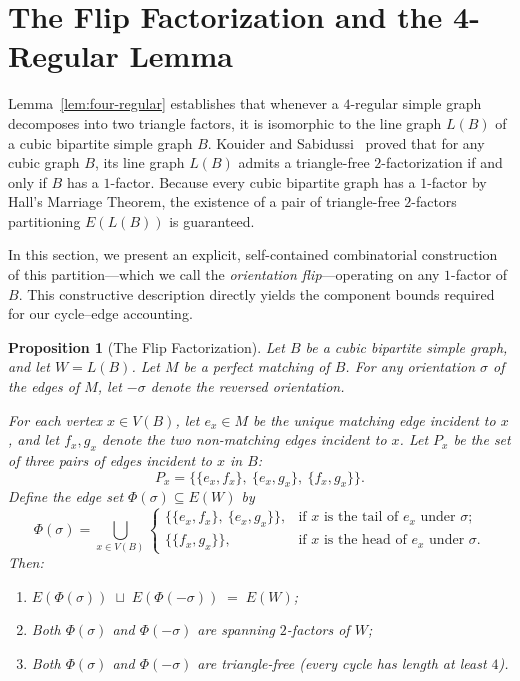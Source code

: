 \documentclass[11pt,reqno]{amsart}
\newtheorem{proposition}[theorem]{Proposition}
\theoremstyle{definition}
\theoremstyle{remark}
\begin{document}
\section{The Flip Factorization and the 4-Regular Lemma}\label{sec:flip}

Lemma~\ref{lem:four-regular} establishes that whenever a $4$-regular simple graph decomposes into two triangle factors, it is isomorphic to the line graph $L(B)$ of a cubic bipartite simple graph $B$. Kouider and Sabidussi~\cite{KS95} proved that for any cubic graph $B$, its line graph $L(B)$ admits a triangle-free $2$-factorization if and only if $B$ has a $1$-factor. Because every cubic bipartite graph has a $1$-factor by Hall's Marriage Theorem, the existence of a pair of triangle-free $2$-factors partitioning $E(L(B))$ is guaranteed.

In this section, we present an explicit, self-contained combinatorial construction of this partition---which we call the \emph{orientation flip}---operating on any $1$-factor of $B$. This constructive description directly yields the component bounds required for our cycle--edge accounting.

\begin{proposition}[The Flip Factorization]\label{prop:flip}
Let $B$ be a cubic bipartite simple graph, and let $W = L(B)$. Let $M$ be a perfect matching of $B$. For any orientation $\sigma$ of the edges of $M$, let $-\sigma$ denote the reversed orientation. 

For each vertex $x \in V(B)$, let $e_x \in M$ be the unique matching edge incident to $x$, and let $f_x, g_x$ denote the two non-matching edges incident to $x$. Let $P_x$ be the set of three pairs of edges incident to $x$ in $B$:
\[
P_x = \bigl\{ \{e_x, f_x\},\ \{e_x, g_x\},\ \{f_x, g_x\} \bigr\}.
\]
Define the edge set $\Phi(\sigma) \subseteq E(W)$ by
\begin{equation}\label{eq:phi-def}
\Phi(\sigma) = \bigcup_{x \in V(B)} \begin{cases}
\bigl\{ \{e_x, f_x\},\ \{e_x, g_x\} \bigr\}, & \text{if } x \text{ is the tail of } e_x \text{ under } \sigma; \\[3pt]
\bigl\{ \{f_x, g_x\} \bigr\}, & \text{if } x \text{ is the head of } e_x \text{ under } \sigma.
\end{cases}
\end{equation}
Then:
\begin{enumerate}[\rm (i)]
    \item $E(\Phi(\sigma)) \;\sqcup\; E(\Phi(-\sigma)) \;=\; E(W)$;
    \item Both $\Phi(\sigma)$ and $\Phi(-\sigma)$ are spanning $2$-factors of $W$;
    \item Both $\Phi(\sigma)$ and $\Phi(-\sigma)$ are triangle-free (every cycle has length at least $4$).
\end{enumerate}
\end{proposition}
\end{document}
